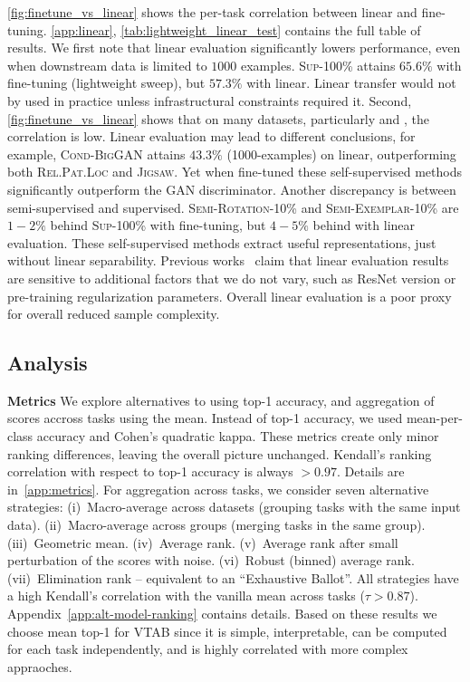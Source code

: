 \ref{fig:finetune_vs_linear} shows the per-task correlation between linear and fine-tuning.
\ref{app:linear}, \ref{tab:lightweight_linear_test} contains the full table of results. We first note that linear evaluation significantly lowers performance, even when downstream data is limited to $1000$ examples.
\textsc{Sup-100\%} attains $65.6\%$ with fine-tuning (lightweight sweep), but $57.3\%$ with linear. Linear transfer would not by used in practice unless infrastructural constraints required it. Second, \ref{fig:finetune_vs_linear} shows that on many datasets, particularly \taskSpecialized{} and \taskStructured{}, the correlation is low. Linear evaluation may lead to different conclusions, for example, \textsc{Cond-BigGAN} attains $43.3\%$ (1000-examples) on linear, outperforming both \textsc{Rel.Pat.Loc} and \textsc{Jigsaw}.
Yet when fine-tuned these self-supervised methods significantly outperform the GAN discriminator. Another discrepancy is between semi-supervised and supervised.
\textsc{Semi-Rotation-10\%} and \textsc{Semi-Exemplar-10\%} are $1-2\%$ behind \textsc{Sup-100\%} with fine-tuning, but $4-5\%$ behind with linear evaluation. These self-supervised methods extract useful representations, just without linear separability. Previous works~\citep{kornblith2018better,kolesnikov2019revisiting} claim that linear evaluation results are sensitive to additional factors that we do not vary, such as ResNet version or pre-training regularization parameters. Overall linear evaluation is a poor proxy for overall reduced sample complexity.

\subsection{Analysis\label{sec:analysis}}

\textbf{Metrics}\quad
We explore alternatives to using top-1 accuracy, and aggregation of scores accross tasks using the mean. Instead of top-1 accuracy, we used mean-per-class accuracy and Cohen's quadratic kappa. These metrics create only minor ranking differences, leaving the overall picture unchanged. Kendall's ranking correlation with respect to top-1 accuracy is always $>0.97$. Details are in~\ref{app:metrics}.
For aggregation across tasks, we consider seven alternative strategies: (i)~Macro-average across datasets (grouping tasks with the same input data). (ii)~Macro-average across groups (merging tasks in the same group). (iii)~Geometric mean. (iv)~Average rank. (v)~Average rank after small perturbation of the scores with noise. (vi)~Robust (binned) average rank. (vii)~Elimination rank -- equivalent to an ``Exhaustive Ballot''. All strategies have a high Kendall's correlation with the vanilla mean across tasks ($\tau>0.87$).
Appendix~\ref{app:alt-model-ranking} contains details. Based on these results we choose mean top-1 for VTAB since it is simple, interpretable, can be computed for each task independently, and is highly correlated with more complex appraoches.

